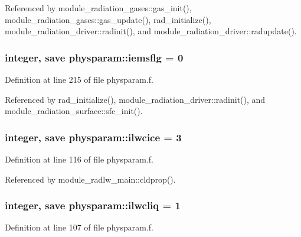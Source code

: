 Referenced by module\+\_\+radiation\+\_\+gases\+::gas\+\_\+init(), module\+\_\+radiation\+\_\+gases\+::gas\+\_\+update(), rad\+\_\+initialize(), module\+\_\+radiation\+\_\+driver\+::radinit(), and module\+\_\+radiation\+\_\+driver\+::radupdate().

\subsubsection[{\texorpdfstring{iemsflg}{iemsflg}}]{\setlength{\rightskip}{0pt plus 5cm}integer, save physparam\+::iemsflg = 0}\hypertarget{namespacephysparam_ac0ecfb79a533c6acab25971a3d871ea2}{}\label{namespacephysparam_ac0ecfb79a533c6acab25971a3d871ea2}


Definition at line 215 of file physparam.\+f.



Referenced by rad\+\_\+initialize(), module\+\_\+radiation\+\_\+driver\+::radinit(), and module\+\_\+radiation\+\_\+surface\+::sfc\+\_\+init().

\subsubsection[{\texorpdfstring{ilwcice}{ilwcice}}]{\setlength{\rightskip}{0pt plus 5cm}integer, save physparam\+::ilwcice = 3}\hypertarget{namespacephysparam_acf555c03fdb00286add9c3be7b43c32e}{}\label{namespacephysparam_acf555c03fdb00286add9c3be7b43c32e}


Definition at line 116 of file physparam.\+f.



Referenced by module\+\_\+radlw\+\_\+main\+::cldprop().

\subsubsection[{\texorpdfstring{ilwcliq}{ilwcliq}}]{\setlength{\rightskip}{0pt plus 5cm}integer, save physparam\+::ilwcliq = 1}\hypertarget{namespacephysparam_a7301d0d9b48fe408c5e67f2c145fbf7e}{}\label{namespacephysparam_a7301d0d9b48fe408c5e67f2c145fbf7e}


Definition at line 107 of file physparam.\+f.




